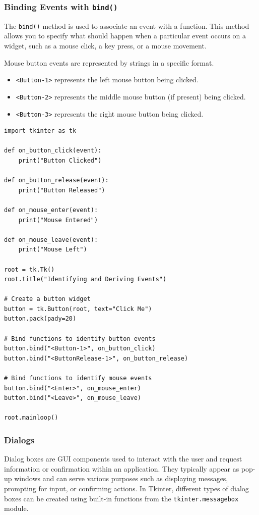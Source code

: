 \newpage
\subsubsection{Binding Events with \texttt{bind()}}
The \texttt{bind()} method is used to associate an event with a function. This method allows you to specify what should happen when a particular event occurs on a widget, such as a mouse click, a key press, or a mouse movement.

Mouse button events are represented by strings in a specific format.

\begin{itemize}
    \item \texttt{<Button-1>} represents the left mouse button being clicked.
    \item \texttt{<Button-2>} represents the middle mouse button (if present) being clicked.
    \item \texttt{<Button-3>} represents the right mouse button being clicked.
\end{itemize}

\begin{codebox}
\begin{verbatim}
import tkinter as tk

def on_button_click(event):
    print("Button Clicked")

def on_button_release(event):
    print("Button Released")

def on_mouse_enter(event):
    print("Mouse Entered")

def on_mouse_leave(event):
    print("Mouse Left")

root = tk.Tk()
root.title("Identifying and Deriving Events")

# Create a button widget
button = tk.Button(root, text="Click Me")
button.pack(pady=20)

# Bind functions to identify button events
button.bind("<Button-1>", on_button_click)
button.bind("<ButtonRelease-1>", on_button_release)

# Bind functions to identify mouse events
button.bind("<Enter>", on_mouse_enter)
button.bind("<Leave>", on_mouse_leave)

root.mainloop()
\end{verbatim}
\end{codebox}

\newpage
\subsubsection{Dialogs}
Dialog boxes are GUI components used to interact with the user and request information or confirmation within an application. They typically appear as pop-up windows and can serve various purposes such as displaying messages, prompting for input, or confirming actions. In Tkinter, different types of dialog boxes can be created using built-in functions from the \texttt{tkinter.messagebox} module.\\

